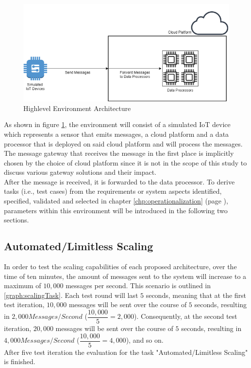 \begin{figure}[ht]
    \includegraphics[width=\linewidth]{images/drawio/highlevelTestArch.png}\centering
    \caption{Highlevel Environment Architecture}
    \label{fig:highlevelEnvArch}
\end{figure}

As shown in figure \ref{fig:highlevelEnvArch}, the environment will consist of a simulated IoT device which represents a sensor that emits messages, a cloud platform and a data processor that is deployed on said cloud platform and will process the messages. The message gateway that receives the message in the first place is implicitly chosen by the choice of cloud platform since it is not in the scope of this study to discuss various gateway solutions and their impact.  \\
After the message is received, it is forwarded to the data processor. To derive tasks (i.e., test cases) from the requirements or system aspects identified, specified, validated and selected in chapter \ref{chp:operationalization} (page \pageref{chp:operationalization}), parameters within this environment will be introduced in the following two sections. 
    
\subsection{Automated/Limitless Scaling}\label{ssec:scaling}

In order to test the scaling capabilities of each proposed architecture, over the time of ten minutes, the amount of messages sent to the system will increase to a maximum of $10,000$ messages per second. This scenario is outlined in \ref{graph:scalingTask}. Each test round will last $5$ seconds, meaning that at the first test iteration, $10,000$ messages will be sent over the course of $5$ seconds, resulting in $2,000Messages/Second$ ($\dfrac{10,000}{5}=2,000$). Consequently, at the second test iteration, $20,000$ messages will be sent over the course of $5$ seconds, resulting in $4,000Messages/Second$ ($\dfrac{10,000}{5}=4,000$), and so on.\\
After five test iteration the evaluation for the task "Automated/Limitless Scaling" is finished.

